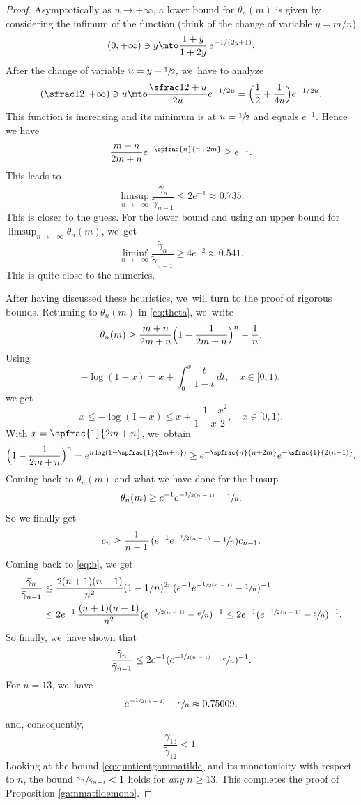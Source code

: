 \begin{proof}
Asymptotically as $n\to +\infty$, a lower bound for $\theta_n(m)$ is given by considering the infimum of the function (think of the change of variable $y=m/n$)
\[
(0,+\infty) \ni y \mto \frac{1+y}{1+2y}\,e^{-1/(2y+1)}.
\]
After the change of variable $u=y+\sfrac 12$, we~have to analyze
\[
(\sfrac 12,+\infty) \ni u \mto \frac{\sfrac12 +u}{2u} e^{-1/2u}= \Bigl(\frac 12 + \frac{1}{4u}\Bigr) e^{-1/2u}.
\]
This function is increasing and its minimum is at $u=\sfrac 12$ and equals $e^{-1}$. Hence we have
\begin{equation}
\frac{m+n}{2m+n}e^{- \spfrac{n}{n+2m}} \geq e^{-1}.
\end{equation}
This leads to
\begin{equation}\label{eq:expdecaytildegammanupper}
\limsup_{n\to +\infty} \frac{\tilde\gamma_n}{\tilde\gamma_{n-1}} \leq 2 e^{-1} \approx 0.735.
\end{equation}
This is closer to the guess.
For the lower bound and using an upper bound for $\limsup_{n\to +\infty} \theta_n(m)$, we~get
\[
\liminf_{n\to +\infty} \frac{\tilde\gamma_n}{\tilde\gamma_{n-1}} \geq 4 e^{-2} \approx 0.541.
\]
This is quite close to the numerics.

After having discussed these heuristics, we~will turn to the proof of rigorous bounds. Returning to $\theta_n(m)$ in \eqref{eq:theta}, we~write
\[
\theta_n(m)\geq \frac{m+n}{2m+n} \Bigl(1- \frac{1}{2m+n}\Bigr)^n - \frac 1n.
\]
Using
\[
- \log (1-x) = x + \int_0^x \frac{t}{1-t} \,dt,\quad x\in [0,1),
\]
we get
\[
x\leq - \log (1-x) \leq x + \frac{1}{1-x} \frac{x^2}{2},\quad x\in [0,1).
\]
With $x=\spfrac{1}{2m+n}$, we~obtain
\[
\Bigl(1- \frac{1}{2m+n}\Bigr)^n= e^{n \log (1- \spfrac{1}{2m+n})}\geq e^{- \spfrac{n}{n+2m} } e^{ - \sfrac{1}{2 (n-1)}}.
\]
Coming back to $\theta_n(m)$ and what we have done for the limsup
\[
\theta_n(m)\geq e^{-1} e^{- \sfrac {1}{2(n-1)}} -\sfrac 1n.
\]
So we finally get
\[
c_n \geq \frac{1}{n-1} \,(e^{-1} e^{- \sfrac 1{2(n-1)}} -\sfrac 1n) c_{n-1}.
\]
Coming back to \eqref{eq:b},
we get
\begin{align*}
\frac{\tilde\gamma_n}{\tilde\gamma_{n-1}}
& \leq \frac{2(n+1)(n-1)}{n^2}(1-1/n)^{2n}(e^{-1} e^{- \sfrac {1}{2(n-1)}} -\sfrac 1n)^{-1} \\
& \leq 2 e^{-1} \,\frac{(n+1)(n-1)}{n^2}(e^{- \sfrac 1{2(n-1)}} -\sfrac en)^{-1} \leq 2 e^{-1}(e^{- \sfrac {1}{2(n-1)}} -\sfrac en)^{-1}.
\end{align*}
So finally, we~have shown that
\begin{equation}\label{eq:quotientgammatilde}
\frac{\tilde\gamma_n}{\tilde\gamma_{n-1}} \leq 2 e^{-1}(e^{- \sfrac {1}{2(n-1)}} -\sfrac en)^{-1}.
\end{equation}
For $n=13$, we~have
\begin{equation} \label{eq:9.9}
e^{- \sfrac 1{2(n-1)}} -\sfrac en \approx 0.75009,
\end{equation}
and, consequently,
\[
\frac{\tilde\gamma_{13}}{\tilde\gamma_{12}} <1.
\]
Looking at the bound \eqref{eq:quotientgammatilde} and its monotonicity with respect to $n$, the bound $\sfrac{\tilde\gamma_n}{\tilde\gamma_{n-1}}<1$ holds for \emph{any} $n\geq 13$. This completes the proof of Proposition \ref{gammatildemono}.
\end{proof}

